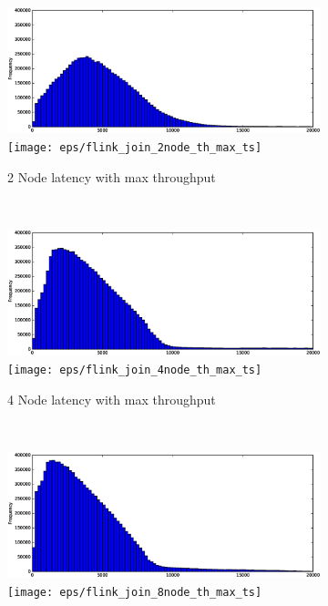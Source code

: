 \begin{figure}
    \centering
    \begin{subfigure}[b]{0.3\textwidth}
        \includegraphics[width=\textwidth]{eps/flink_join_2node_th_max_hist}
         \texttt{[image: eps/flink\_join\_2node\_th\_max\_ts]}

        \caption{2 Node latency with max throughput}
    \end{subfigure}
    ~ 
    \begin{subfigure}[b]{0.3\textwidth}
        \includegraphics[width=\textwidth]{eps/flink_join_4node_th_max_hist}
         \texttt{[image: eps/flink\_join\_4node\_th\_max\_ts]}

        \caption{4 Node latency with max throughput }
    \end{subfigure}
    ~ 
    \begin{subfigure}[b]{0.3\textwidth}
        \includegraphics[width=\textwidth]{eps/flink_join_8node_th_max_hist}
         \texttt{[image: eps/flink\_join\_8node\_th\_max\_ts]}


\end{subfigure}
\end{figure}
